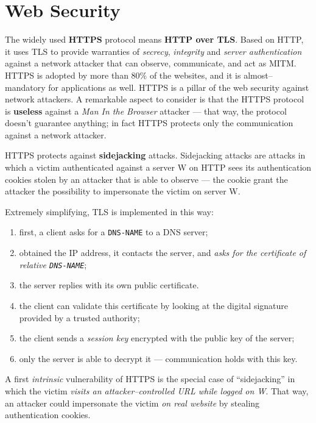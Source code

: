 \documentclass[10pt]{extreport}
\begin{document}
\chapter{Web Security}

The widely used \textbf{HTTPS} protocol means \textbf{HTTP over TLS}. Based on
HTTP, it uses TLS to provide warranties of \emph{secrecy}, \emph{integrity} and
\emph{server authentication} against a network attacker that can observe,
communicate, and act as MITM. HTTPS is adopted by more than $80\%$ of the
websites, and it is almost--mandatory for applications as well. HTTPS is a
pillar of the web security against network attackers. A remarkable aspect to
consider is that the HTTPS protocol is \textbf{useless} against a \emph{Man In
the Browser} attacker --- that way, the protocol doesn't guarantee anything; in
fact HTTPS protects only the communication against a network attacker.

HTTPS protects against \textbf{sidejacking} attacks. Sidejacking attacks are
attacks in which a victim authenticated against a server W on HTTP sees its
authentication cookies stolen by an attacker that is able to observe --- the
cookie grant the attacker the possibility to impersonate the victim on server
W.

Extremely simplifying, TLS is implemented in this way:
\begin{enumerate}
    \item first, a client asks for a \texttt{DNS-NAME} to a DNS server;
    \item obtained the IP address, it contacts the server, and \emph{asks for
        the certificate of relative \texttt{DNS-NAME}};
    \item the server replies with its own public certificate.
    \item the client can validate this certificate by looking at the digital
        signature provided by a trusted authority;
    \item the client sends a \emph{session key} encrypted with the public key
        of the server;
    \item only the server is able to decrypt it --- communication holds with this
        key.
\end{enumerate}

A first \emph{intrinsic} vulnerability of HTTPS is the special case of
``sidejacking'' in which the victim \emph{visits an attacker--controlled URL
while logged on W}. That way, an attacker could impersonate the victim \emph{on
real website} by stealing authentication cookies.
\end{document}
